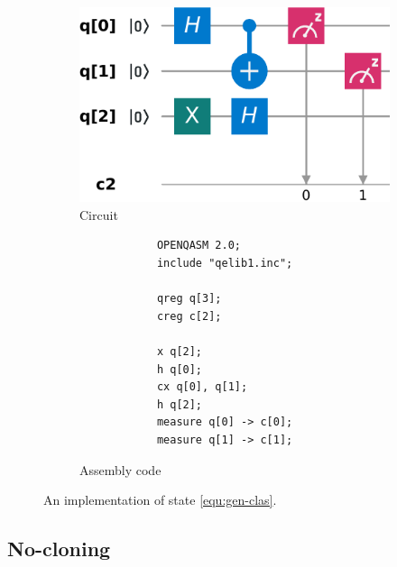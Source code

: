\documentclass[11pt]{article}
\theoremstyle{plain}
\theoremstyle{definition}
\begin{document}
\begin{figure}[h]
	\centering
	\begin{subfigure}[b]{4cm}
		\centering
		\includegraphics[width = \textwidth]{entg_sep_circuit.pdf}
		\caption{Circuit}
		\label{fig:entg-circ}
	\end{subfigure}
	\hspace*{1cm}
	\begin{subfigure}[b]{4cm}
		\centering
		\begin{verbatim}
            OPENQASM 2.0;
            include "qelib1.inc";
            
            qreg q[3];
            creg c[2];
            
            x q[2];
            h q[0];
            cx q[0], q[1];
            h q[2];
            measure q[0] -> c[0];
            measure q[1] -> c[1];
        \end{verbatim}
		\caption{Assembly code}
		\label{fig:entg-code}
	\end{subfigure}
	\caption{An implementation of state \eqref{equ:gen-clas}.}
	\label{fig:entg-sep}
\end{figure}



\subsection{No-cloning}\label{sec:no-cloning}
\end{document}
